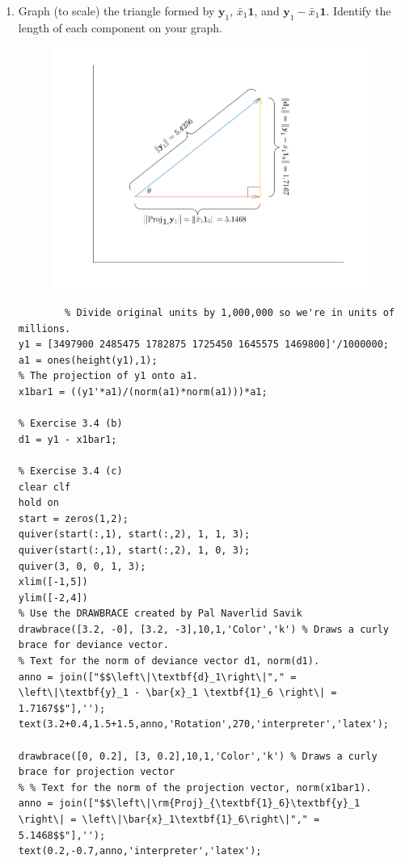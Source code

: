 \begin{enumerate}[label=(\alph*)]
    \item Graph (to scale) the triangle formed by $\textbf{y}_1$, $\bar{x}_1\textbf{1}$, and $\textbf{y}_1 - \bar{x}_1\textbf{1}$. Identify the length of each component on your graph.
    \begin{figure}[H]
        \centering
        \includegraphics[scale=0.5]{./matlab/chapter-3/sol3.4c.png}
    \end{figure}

    \begin{lstlisting}
        % Divide original units by 1,000,000 so we're in units of millions.
y1 = [3497900 2485475 1782875 1725450 1645575 1469800]'/1000000;
a1 = ones(height(y1),1);
% The projection of y1 onto a1.
x1bar1 = ((y1'*a1)/(norm(a1)*norm(a1)))*a1;

% Exercise 3.4 (b)
d1 = y1 - x1bar1;

% Exercise 3.4 (c)
clear clf
hold on
start = zeros(1,2);
quiver(start(:,1), start(:,2), 1, 1, 3);
quiver(start(:,1), start(:,2), 1, 0, 3);
quiver(3, 0, 0, 1, 3);
xlim([-1,5])
ylim([-2,4])
% Use the DRAWBRACE created by Pal Naverlid Savik
drawbrace([3.2, -0], [3.2, -3],10,1,'Color','k') % Draws a curly brace for deviance vector.
% Text for the norm of deviance vector d1, norm(d1).
anno = join(["$$\left\|\textbf{d}_1\right\|"," = \left\|\textbf{y}_1 - \bar{x}_1 \textbf{1}_6 \right\| = 1.7167$$"],'');
text(3.2+0.4,1.5+1.5,anno,'Rotation',270,'interpreter','latex');

drawbrace([0, 0.2], [3, 0.2],10,1,'Color','k') % Draws a curly brace for projection vector
% % Text for the norm of the projection vector, norm(x1bar1).
anno = join(["$$\left\|\rm{Proj}_{\textbf{1}_6}\textbf{y}_1 \right\| = \left\|\bar{x}_1\textbf{1}_6\right\|"," = 5.1468$$"],'');
text(0.2,-0.7,anno,'interpreter','latex');


\end{lstlisting}
\end{enumerate}
